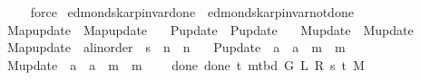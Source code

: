 \begin{isabellebody}
\ \ \ \ \isamarkupfalse%
\ force\isanewline
{}\isamarkupfalse%
%
\endisatagproof
{\isafoldproof}%
%
\isadelimproof
\isanewline
%
\endisadelimproof
\isanewline
{}\isamarkupfalse%
\ edmonds{\isacharunderscore}{\kern0pt}karp{\isacharunderscore}{\kern0pt}invar{\isacharunderscore}{\kern0pt}done{\isacharunderscore}{\kern0pt}{}\ {\isacharequal}{\kern0pt}\ edmonds{\isacharunderscore}{\kern0pt}karp{\isacharunderscore}{\kern0pt}invar{\isacharunderscore}{\kern0pt}not{\isacharunderscore}{\kern0pt}done{\isacharunderscore}{\kern0pt}{}\ \isanewline
\ \ Map{\isacharunderscore}{\kern0pt}update\ {\isacharequal}{\kern0pt}\ Map{\isacharunderscore}{\kern0pt}update\ \isanewline
\ \ P{\isacharunderscore}{\kern0pt}update\ {\isacharequal}{\kern0pt}\ P{\isacharunderscore}{\kern0pt}update\ \isanewline
\ \ M{\isacharunderscore}{\kern0pt}update\ {\isacharequal}{\kern0pt}\ M{\isacharunderscore}{\kern0pt}update\ \isanewline
\ \ Map{\isacharunderscore}{\kern0pt}update\ {\isacharcolon}{\kern0pt}{\isacharcolon}{\kern0pt}\ {\isachardoublequoteopen}{\isacharprime}{\kern0pt}a{\isacharcolon}{\kern0pt}{\isacharcolon}{\kern0pt}linorder\ {\isasymRightarrow}\ {\isacharprime}{\kern0pt}s\ {\isasymRightarrow}\ {\isacharprime}{\kern0pt}n\ {\isasymRightarrow}\ {\isacharprime}{\kern0pt}n{\isachardoublequoteclose}\ \isanewline
\ \ P{\isacharunderscore}{\kern0pt}update\ {\isacharcolon}{\kern0pt}{\isacharcolon}{\kern0pt}\ {\isachardoublequoteopen}{\isacharprime}{\kern0pt}a\ {\isasymRightarrow}\ {\isacharprime}{\kern0pt}a\ {\isasymRightarrow}\ {\isacharprime}{\kern0pt}m\ {\isasymRightarrow}\ {\isacharprime}{\kern0pt}m{\isachardoublequoteclose}\ \isanewline
\ \ M{\isacharunderscore}{\kern0pt}update\ {\isacharcolon}{\kern0pt}{\isacharcolon}{\kern0pt}\ {\isachardoublequoteopen}{\isacharprime}{\kern0pt}a\ {\isasymRightarrow}\ {\isacharprime}{\kern0pt}a\ {\isasymRightarrow}\ {\isacharprime}{\kern0pt}m\ {\isasymRightarrow}\ {\isacharprime}{\kern0pt}m{\isachardoublequoteclose}\ {\isacharplus}{\kern0pt}\isanewline
\ \ \ done{\isacharunderscore}{\kern0pt}{}{\isacharcolon}{\kern0pt}\ {\isachardoublequoteopen}done{\isacharunderscore}{\kern0pt}{}\ t\ {\isacharparenleft}{\kern0pt}m{\isacharunderscore}{\kern0pt}tbd\ G\ L\ R\ s\ t\ M{\isacharparenright}{\kern0pt}{\isachardoublequoteclose}\isanewline
%
\isadeliminvisible
\isanewline
%
\endisadeliminvisible
%
\isataginvisible
{}\isamarkupfalse%

\end{isabellebody}
